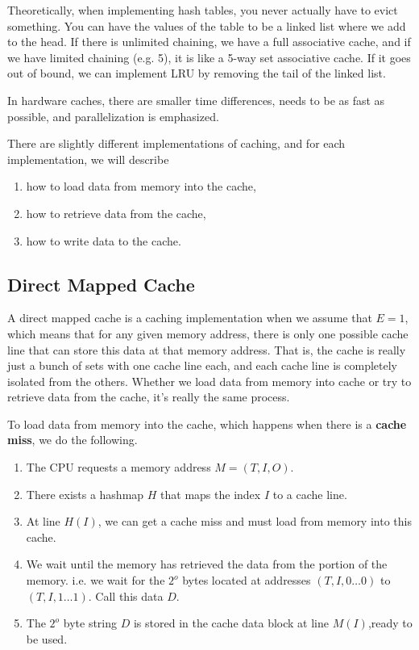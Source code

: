   Theoretically, when implementing hash tables, you never actually have to evict something. You can have the values of the table to be a linked list where we add to the head. If there is unlimited chaining, we have a full associative cache, and if we have limited chaining (e.g. 5), it is like a 5-way set associative cache. If it goes out of bound, we can implement LRU by removing the tail of the linked list. 

  \begin{definition}
    \label{def:hardware-caches}
    In hardware caches, there are smaller time differences, needs to be as fast as possible, and parallelization is emphasized. 
  \end{definition}

  There are slightly different implementations of caching, and for each implementation, we will describe 
  \begin{enumerate}
    \item how to load data from memory into the cache, 
    \item how to retrieve data from the cache, 
    \item how to write data to the cache. 
  \end{enumerate}

\subsection{Direct Mapped Cache} 

  A direct mapped cache is a caching implementation when we assume that $E = 1$, which means that for any given memory address, there is only one possible cache line that can store this data at that memory address. That is, the cache is really just a bunch of sets with one cache line each, and each cache line is completely isolated from the others. Whether we load data from memory into cache or try to retrieve data from the cache, it's really the same process. 

  \begin{theorem}[Placement]
    \label{thm:placement}
    To load data from memory into the cache, which happens when there is a \textbf{cache miss}, we do the following. 
    \begin{enumerate}
      \item The CPU requests a memory address $M = (T, I, O)$. 
      \item There exists a hashmap $H$ that maps the index $I$ to a cache line. 
      \item At line $H(I)$, we can get a cache miss and must load from memory into this cache. 
      \item We wait until the memory has retrieved the data from the portion of the memory. i.e. we wait for the $2^o$ bytes located at addresses $(T, I, 0\ldots 0)$ to $(T, I, 1\ldots 1)$. Call this data $D$. 
      \item The $2^o$ byte string $D$ is stored in the cache data block at line $M(I)$,ready to be used. 
    \end{enumerate}
  \end{theorem}

